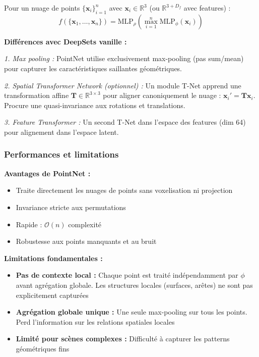 Pour un nuage de points $\{\mathbf{x}_i\}_{i=1}^n$ avec $\mathbf{x}_i \in \mathbb{R}^3$ (ou $\mathbb{R}^{3+D_f}$ avec features) :
\[
f(\{\mathbf{x}_1, \ldots, \mathbf{x}_n\}) = \text{MLP}_{\rho}\left(\max_{i=1}^n \text{MLP}_{\phi}(\mathbf{x}_i)\right)
\]

\textbf{Différences avec DeepSets vanille :}

\textit{1. Max pooling :}
PointNet utilise exclusivement max-pooling (pas sum/mean) pour capturer les caractéristiques saillantes géométriques.

\textit{2. Spatial Transformer Network (optionnel) :}
Un module T-Net apprend une transformation affine $\mathbf{T} \in \mathbb{R}^{3 \times 3}$ pour aligner canoniquement le nuage : $\mathbf{x}_i' = \mathbf{T}\mathbf{x}_i$. Procure une quasi-invariance aux rotations et translations.

\textit{3. Feature Transformer :}
Un second T-Net dans l'espace des features (dim 64) pour alignement dans l'espace latent.

\subsubsection{Performances et limitations}

\textbf{Avantages de PointNet :}
\begin{itemize}
    \item Traite directement les nuages de points sans voxelisation ni projection
    \item Invariance stricte aux permutations
    \item Rapide : $\mathcal{O}(n)$ complexité
    \item Robustesse aux points manquants et au bruit
\end{itemize}

\textbf{Limitations fondamentales :}
\begin{itemize}
    \item \textbf{Pas de contexte local :} Chaque point est traité indépendamment par $\phi$ avant agrégation globale. Les structures locales (surfaces, arêtes) ne sont pas explicitement capturées
    \item \textbf{Agrégation globale unique :} Une seule max-pooling sur tous les points. Perd l'information sur les relations spatiales locales
    \item \textbf{Limité pour scènes complexes :} Difficulté à capturer les patterns géométriques fins
\end{itemize}

